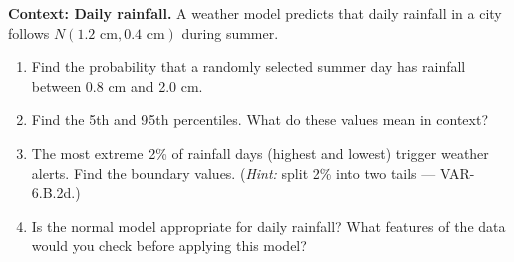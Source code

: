 \documentclass[10pt]{article}
\begin{document}
\vspace{0.1in}

\begin{tcolorbox}[colback=redbg, colframe=black!40, boxrule=0.6pt, arc=2mm,
    left=3mm, right=3mm, top=2mm, bottom=2mm, title=\textbf{Tier E --- Extension}]
\textbf{Context: Daily rainfall.} A weather model predicts that daily rainfall in a
city follows $N(1.2\text{ cm}, 0.4\text{ cm})$ during summer.

\begin{enumerate}
  \item Find the probability that a randomly selected summer day has rainfall between
        0.8 cm and 2.0 cm.
        \vspace{0.9in}
  \item Find the 5th and 95th percentiles. What do these values mean in context?
        \vspace{0.9in}
  \item The most extreme 2\% of rainfall days (highest and lowest) trigger weather
        alerts. Find the boundary values. (\textit{Hint:} split 2\% into two tails ---
        VAR-6.B.2d.)
        \vspace{0.9in}
  \item Is the normal model appropriate for daily rainfall? What features of the data
        would you check before applying this model?
\end{enumerate}
\end{tcolorbox}
\end{document}
